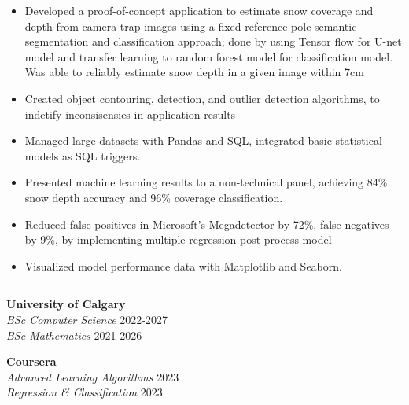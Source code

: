 \documentclass[a4paper,11pt]{article}
\def\sectionv{\vspace{.2cm}}
\def\subsectionv{\vspace{-5.3ex}}
\def\postpointsv{\vspace{0cm}}
\def\betweenjobsv{\vspace{0.4cm}}
\begin{document}
\begin{itemize}[leftmargin=.5cm, itemsep=.1cm, before=\subsectionv, after=\postpointsv]
    \item Developed a proof-of-concept application to estimate snow coverage and depth from camera trap images using a fixed-reference-pole semantic segmentation and classification approach; done by using Tensor flow for U-net model and transfer learning to random forest model for classification model. Was able to reliably estimate snow depth in a given image within 7cm
    \item Created object contouring, detection, and outlier detection algorithms, to indetify inconsisensies in application results
    \item Managed large datasets with Pandas and SQL, integrated basic statistical models as SQL triggers.
    \item Presented machine learning results to a non-technical panel, achieving 84\% snow depth accuracy and 96\% coverage classification.
    \item Reduced false positives in Microsoft's Megadetector by 72\%, false negatives by 9\%, by implementing multiple regression post process model
    \item Visualized model performance data with Matplotlib and Seaborn.
\end{itemize}

\betweenjobsv

\noindent {}
\vspace{-2.35em} %
\par\noindent
\rule{\textwidth}{0.4pt}

\sectionv

\noindent
\begin{minipage}[t]{0.45\textwidth} %
    \textbf{University of Calgary} \\
    \textit{BSc Computer Science} \hfill 2022-2027 \\
    \textit{BSc Mathematics} \hfill 2021-2026
\end{minipage}
\hfill %
\begin{minipage}[t]{0.45\textwidth} %
    \textbf{Coursera} \\
    \textit{Advanced Learning Algorithms} \hfill 2023 \\
    \textit{Regression \& Classification} \hfill 2023
\end{minipage}
\end{document}
